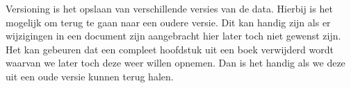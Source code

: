 Versioning is het opslaan van verschillende versies van de data. Hierbij is het mogelijk om terug te gaan naar een oudere versie. Dit kan handig zijn als er wijzigingen in een document zijn aangebracht hier later toch niet gewenst zijn. Het kan gebeuren dat een compleet hoofdstuk uit een boek verwijderd wordt waarvan we later toch deze weer willen opnemen. Dan is het handig als we deze uit een oude versie kunnen terug halen.

